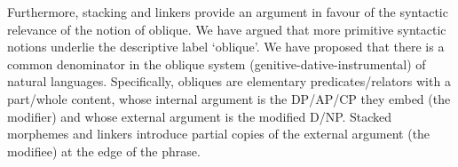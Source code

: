 \documentclass[output=paper]{langsci/langscibook}
\begin{document}
Furthermore, stacking and linkers provide an argument in favour of the syntactic relevance of the notion of oblique. We have argued that more primitive syntactic notions underlie the descriptive label ‘oblique’. We have proposed that there is a common denominator in the oblique system (genitive-dative-instrumental) of natural languages. Specifically, obliques are elementary predicates\slash relators with a part\slash whole content, whose internal argument is the DP\slash AP\slash CP they embed (the modifier) and whose external argument is the modified D\slash NP. Stacked morphemes and linkers introduce partial copies of the external argument (the modifiee) at the edge of the  phrase. 

% 
% 
% 
% 
% 
% 
% 
% 
% 
% 
% 
% 
\end{document}

